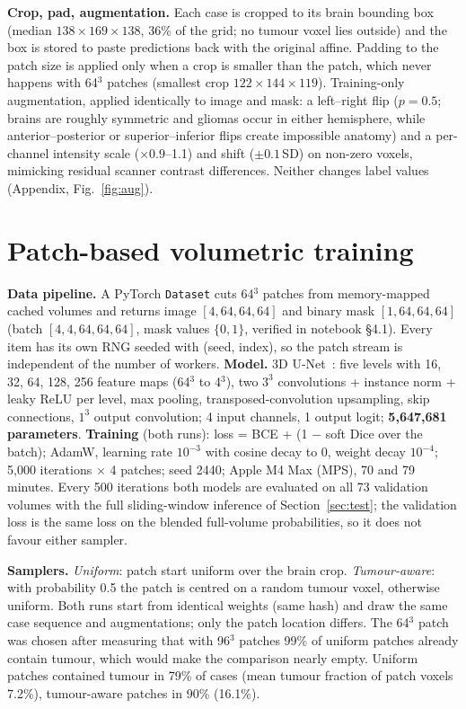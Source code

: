 \documentclass[10pt,a4paper]{article}
\begin{document}
\textbf{Crop, pad, augmentation.} Each case is cropped to its brain bounding box (median $138\times169\times138$, 36\% of the grid; no tumour voxel lies outside) and the box is stored to paste predictions back with the original affine. Padding to the patch size is applied only when a crop is smaller than the patch, which never happens with 64$^3$ patches (smallest crop $122\times144\times119$). Training-only augmentation, applied identically to image and mask: a left--right flip ($p=0.5$; brains are roughly symmetric and gliomas occur in either hemisphere, while anterior--posterior or superior--inferior flips create impossible anatomy) and a per-channel intensity scale ($\times0.9$--1.1) and shift ($\pm0.1$\,SD) on non-zero voxels, mimicking residual scanner contrast differences. Neither changes label values (Appendix, Fig.~\ref{fig:aug}).

\section{Patch-based volumetric training}
\textbf{Data pipeline.} A PyTorch \texttt{Dataset} cuts 64$^3$ patches from memory-mapped cached volumes and returns image $[4,64,64,64]$ and binary mask $[1,64,64,64]$ (batch $[4,4,64,64,64]$, mask values $\{0,1\}$, verified in notebook \S4.1). Every item has its own RNG seeded with (seed, index), so the patch stream is independent of the number of workers.
\textbf{Model.} 3D U-Net~\cite{ronneberger2015,cicek2016}: five levels with 16, 32, 64, 128, 256 feature maps (64$^3$ to 4$^3$), two $3^3$ convolutions + instance norm + leaky ReLU per level, max pooling, transposed-convolution upsampling, skip connections, $1^3$ output convolution; 4 input channels, 1 output logit; \textbf{5{,}647{,}681 parameters}. \textbf{Training} (both runs): loss = BCE + (1 $-$ soft Dice over the batch); AdamW, learning rate $10^{-3}$ with cosine decay to 0, weight decay $10^{-4}$; 5{,}000 iterations $\times$ 4 patches; seed 2440; Apple M4 Max (MPS), 70 and 79 minutes. Every 500 iterations both models are evaluated on all 73 validation volumes with the full sliding-window inference of Section~\ref{sec:test}; the validation loss is the same loss on the blended full-volume probabilities, so it does not favour either sampler.

\textbf{Samplers.} \emph{Uniform}: patch start uniform over the brain crop. \emph{Tumour-aware}: with probability 0.5 the patch is centred on a random tumour voxel, otherwise uniform. Both runs start from identical weights (same hash) and draw the same case sequence and augmentations; only the patch location differs. The 64$^3$ patch was chosen after measuring that with 96$^3$ patches 99\% of uniform patches already contain tumour, which would make the comparison nearly empty. Uniform patches contained tumour in 79\% of cases (mean tumour fraction of patch voxels 7.2\%), tumour-aware patches in 90\% (16.1\%).
\end{document}
